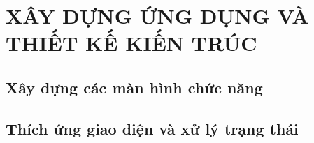 ﻿\chapstart
\section{XÂY DỰNG ỨNG DỤNG VÀ THIẾT KẾ KIẾN TRÚC}
\label{sec:application-build}
\begingroup
{}
\setlength{\emergencystretch}{1em}


\subsection{Xây dựng các màn hình chức năng}
\label{sec:application-screens}

\FloatBarrier

\FloatBarrier

\FloatBarrier
\subsection{Thích ứng giao diện và xử lý trạng thái}
\label{sec:application-responsive}

\endgroup
